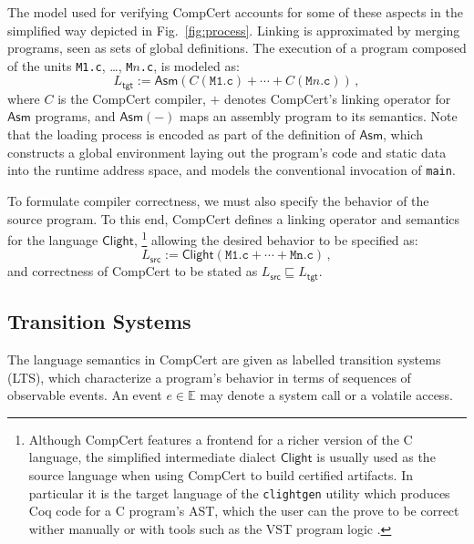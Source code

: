 \documentclass[sigplan,10pt,review,anonymous]{acmart}
\newcommand{\kw}[1]{\ensuremath{ \mathsf{#1} }}
\begin{document}
The model used for verifying CompCert accounts for
some of these aspects in the simplified way
depicted in Fig.~\ref{fig:process}.
Linking is approximated by
merging programs, seen as sets of global definitions.
The execution
of a program composed of the units
\texttt{M1.c}, \ldots, \texttt{M$n$.c},
is modeled as:
\[
    L_\kw{tgt} :=
    \kw{Asm}(C(\texttt{M1.c}) +
             \cdots +
             C(\texttt{M$n$.c})) \,,
\]
where $C$ is the CompCert compiler,
$+$ denotes CompCert's linking operator for \kw{Asm} programs, and
$\kw{Asm}(-)$ maps an assembly program to its semantics.
Note that the loading process is encoded
as part of the definition of $\kw{Asm}$,
which constructs a global environment
laying out the program's code and static data
into the runtime address space,
and models the conventional invocation of \texttt{main}.

To formulate compiler correctness,
we must also specify the behavior of the source program.
To this end,
CompCert defines a linking operator
and semantics
for the language $\kw{Clight}$,%
\footnote{
  Although CompCert features a frontend for a richer version
  of the C language,
  the simplified intermediate dialect \kw{Clight}
  is usually used as the source language
  when using CompCert to build certified artifacts.
  In particular it is the target language of the
  \texttt{clightgen} utility which
  produces Coq code for a C program's AST,
  which the user can the prove to be correct
  wither manually or with tools such as the VST program logic
  \cite{vst}.
}
allowing the desired behavior to be specified as:
\[
    L_\kw{src} :=
    \kw{Clight}(\texttt{M1.c} + \cdots + \texttt{Mn.c}) \,,
\]
and correctness of CompCert
to be stated as $L_\kw{src} \sqsubseteq L_\kw{tgt}$.


\subsection{Transition Systems} \label{sec:sem:closed} %

The language semantics in CompCert are
given as labelled transition systems (LTS),
which characterize a program's behavior in terms of
sequences of observable events.
An event $e \in \mathbb{E}$ may denote
a system call or a volatile access.
\end{document}
